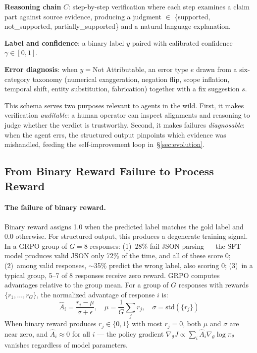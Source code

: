 \documentclass{article}
\begin{document}
\textbf{Reasoning chain} $C$: step-by-step verification where each step examines a claim part against source evidence, producing a judgment $\in$ \{supported, not\_supported, partially\_supported\} and a natural language explanation.

\textbf{Label and confidence}: a binary label $y$ paired with calibrated confidence $\gamma \in [0,1]$.

\textbf{Error diagnosis}: when $y{=}$Not Attributable, an error type $e$ drawn from a six-category taxonomy (numerical exaggeration, negation flip, scope inflation, temporal shift, entity substitution, fabrication) together with a fix suggestion $s$.

This schema serves two purposes relevant to agents in the wild.
First, it makes verification \emph{auditable}: a human operator can inspect alignments and reasoning to judge whether the verdict is trustworthy.
Second, it makes failures \emph{diagnosable}: when the agent errs, the structured output pinpoints which evidence was mishandled, feeding the self-improvement loop in~\S\ref{sec:evolution}.


\subsection{From Binary Reward Failure to Process Reward}
\label{sec:negative}\label{sec:reward}

\paragraph{The failure of binary reward.}
Binary reward assigns 1.0 when the predicted label matches the gold label and 0.0 otherwise.
For structured output, this produces a degenerate training signal.
In a GRPO group of $G{=}8$ responses:
(1)~28\% fail JSON parsing --- the SFT model produces valid JSON only 72\% of the time, and all of these score 0;
(2)~among valid responses, $\sim$35\% predict the wrong label, also scoring 0;
(3)~in a typical group, 5--7 of 8 responses receive zero reward.
GRPO computes advantages relative to the group mean.
For a group of $G$ responses with rewards $\{r_1, \ldots, r_G\}$, the normalized advantage of response $i$ is:
\begin{equation}
\hat{A}_i = \frac{r_i - \mu}{\sigma + \epsilon}, \quad \mu = \frac{1}{G}\sum_{j} r_j, \quad \sigma = \text{std}(\{r_j\})
\label{eq:advantage}
\end{equation}
When binary reward produces $r_j \in \{0, 1\}$ with most $r_j = 0$, both $\mu$ and $\sigma$ are near zero, and $\hat{A}_i \approx 0$ for all $i$ --- the policy gradient $\nabla_\theta J \propto \sum_i \hat{A}_i \nabla_\theta \log \pi_\theta$ vanishes regardless of model parameters.
\end{document}
